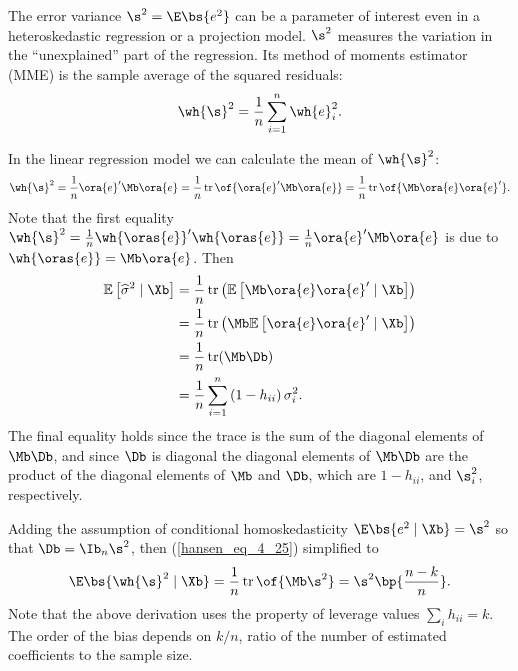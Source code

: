 The error variance $\s^2 = \E\bs{e^2}$ can be a parameter of interest even in a heteroskedastic regression or a projection model. $\s^2$ measures the variation in the ``unexplained'' part of the regression. Its method of moments estimator (MME) is the sample average of the squared residuals:
\begin{equation}
    \notag
    \wh{\s}^2 = \frac{1}{n} \sum_{i=1}^n \wh{e}_i^2.
\end{equation}

In the linear regression model we can calculate the mean of $\wh{\s}^2$:
\begin{equation}
    \notag
    \wh{\s}^2 = \frac{1}{n} \ora{e}^\prime \Mb \ora{e} = \frac{1}{n} \operatorname*{tr}\of{\ora{e}^\prime \Mb \ora{e}} = \frac{1}{n} \operatorname*{tr}\of{\Mb \ora{e} \ora{e}^\prime} .
\end{equation}
Note that the first equality $\wh{\s}^2 = \frac{1}{n} \wh{\oras{e}}^\prime \wh{\oras{e}} = \frac{1}{n} \ora{e}^\prime \Mb \ora{e}$ is due to $\wh{\oras{e}} = \Mb \ora{e}$.
Then 
\begin{equation}
    \label{hansen_eq_4_25}
    \begin{aligned}
        \mathbb{E}\left[\widehat{\sigma}^2 \mid \Xb \right] & =\frac{1}{n} \operatorname{tr}\left(\mathbb{E}\left[\Mb \ora{e} \ora{e}^{\prime} \mid \Xb \right]\right) \\
        & =\frac{1}{n} \operatorname{tr}\left(\Mb \mathbb{E}\left[\ora{e} \ora{e}^{\prime} \mid \Xb \right]\right) \\
        & =\frac{1}{n} \operatorname{tr}(\Mb \Db) \\
        & =\frac{1}{n} \sum_{i=1}^n\left(1-h_{i i}\right) \sigma_i^2 .
    \end{aligned}
\end{equation}
The final equality holds since the trace is the sum of the diagonal elements of $\Mb \Db$, and since $\Db$ is diagonal the diagonal elements of $\Mb \Db$ are the product of the diagonal elements of $\Mb$ and $\Db$, which are $1-h_{ii}$, and $\s_i^2$, respectively.

Adding the assumption of conditional homoskedasticity $\E\bs{e^2 \mid \Xb} = \s^2$ so that $\Db = \Ib_n \s^2$, then (\ref{hansen_eq_4_25}) simplified to
\begin{equation}
    \notag
    \E\bs{\wh{\s}^2 \mid \Xb} = \frac{1}{n} \operatorname{tr} \of{\Mb \s^2} = \s^2 \bp{\frac{n-k}{n}}.
\end{equation}
Note that the above derivation uses the property of leverage values $\sum_{i} h_{ii} = k$.  The order of the bias depends on $k/n$, ratio of the number of estimated coefficients to the sample size.

